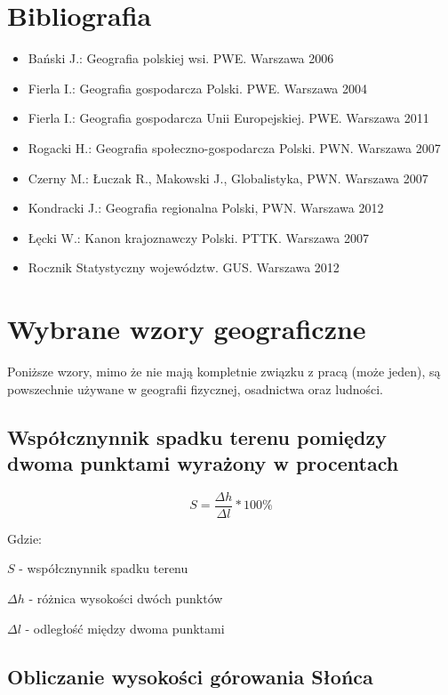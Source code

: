 \documentclass[a4paper,10pt]{article}
\begin{document}
\newpage
\section{Bibliografia}
 \begin{itemize}
     \item Bański J.: Geografia polskiej wsi. PWE. Warszawa 2006
     \item Fierla I.: Geografia gospodarcza Polski. PWE. Warszawa 2004
     \item Fierla I.: Geografia gospodarcza Unii Europejskiej. PWE. Warszawa 2011
     \item Rogacki H.: Geografia społeczno-gospodarcza Polski. PWN. Warszawa 2007
     \item Czerny M.: Łuczak R., Makowski J., Globalistyka, PWN. Warszawa 2007
     \item Kondracki J.: Geografia regionalna Polski, PWN. Warszawa 2012
     \item Łęcki W.: Kanon krajoznawczy Polski. PTTK. Warszawa 2007
     \item Rocznik Statystyczny województw. GUS. Warszawa 2012
    \end{itemize}
\section{Wybrane wzory geograficzne}
  Poniższe wzory, mimo że nie mają kompletnie związku z pracą (może jeden), są powszechnie używane w geografii fizycznej, osadnictwa oraz ludności.
  \subsection{Współcznynnik spadku terenu pomiędzy dwoma punktami wyrażony w procentach}
  
   \begin{equation}
    S = \frac{\Delta h}{\Delta l} * 100\%
   \end{equation}
    
   Gdzie:
    
   $ S $ - współcznynnik spadku terenu
    
   $ \Delta h $ - różnica wysokości dwóch punktów
    
   $ \Delta l $ - odległość między dwoma punktami
    
  \subsection{Obliczanie wysokości górowania Słońca}
  
\end{document}
